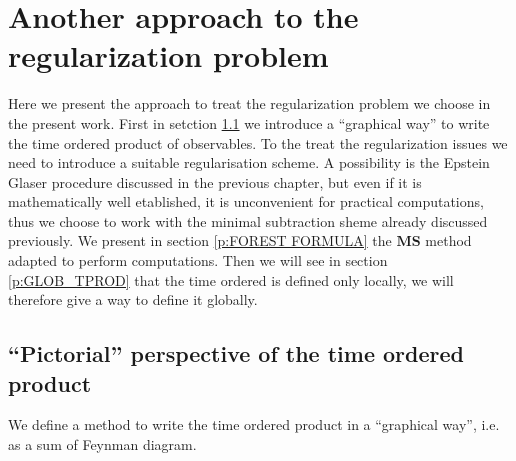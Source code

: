 \documentclass[11pt]{book}
\newcommand{\MS}{\textbf{MS}}
\theoremstyle{break}
\begin{document}
\section{Another approach to the regularization problem}
\label{p:ANOTHER_APPROACH}


Here we present the approach to treat the regularization problem we choose in the present work. First in setction \ref{p:PIC_REG_PB} we introduce a ``graphical way'' to write the time ordered product of observables. To the treat the regularization issues we need to introduce a suitable regularisation scheme. A possibility is the Epstein Glaser procedure discussed in the previous chapter, but even if it is mathematically well etablished, it is unconvenient for practical computations, thus we choose to work with the minimal subtraction sheme already discussed previously. We present in section \ref{p:FOREST FORMULA} the $\MS$ method adapted to perform computations. Then we will see in section \ref{p:GLOB_TPROD} that the time ordered is defined only locally, we will therefore give a way to define it globally. 


\subsection{``Pictorial'' perspective of the time ordered product}
\label{p:PIC_REG_PB}


We define a method to write the time ordered product in a ``graphical way'', i.e. as a sum of Feynman diagram. 


\bigskip
\end{document}
